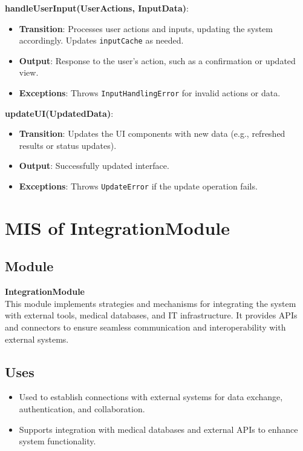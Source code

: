 \documentclass[12pt, titlepage]{article}
\begin{document}
\textbf{handleUserInput(UserActions, InputData)}:
\begin{itemize}
    \item \textbf{Transition}: Processes user actions and inputs, updating the system accordingly. Updates \texttt{inputCache} as needed.
    \item \textbf{Output}: Response to the user's action, such as a confirmation or updated view.
    \item \textbf{Exceptions}: Throws \texttt{InputHandlingError} for invalid actions or data.
\end{itemize}

\textbf{updateUI(UpdatedData)}:
\begin{itemize}
    \item \textbf{Transition}: Updates the UI components with new data (e.g., refreshed results or status updates).
    \item \textbf{Output}: Successfully updated interface.
    \item \textbf{Exceptions}: Throws \texttt{UpdateError} if the update operation fails.
\end{itemize}

\newpage
\section{MIS of IntegrationModule}

\subsection{Module}
\textbf{IntegrationModule} \\
This module implements strategies and mechanisms for integrating the system with external tools, medical databases, and IT infrastructure. It provides APIs and connectors to ensure seamless communication and interoperability with external systems.

\subsection{Uses}
\begin{itemize}
    \item Used to establish connections with external systems for data exchange, authentication, and collaboration.
    \item Supports integration with medical databases and external APIs to enhance system functionality.
\end{itemize}
\end{document}
